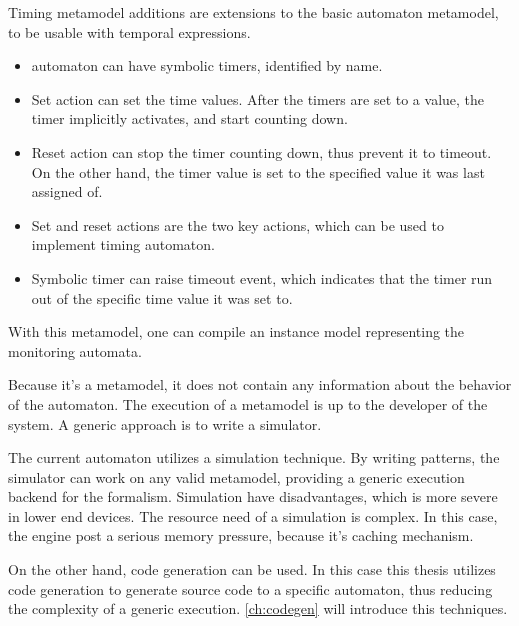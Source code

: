 Timing metamodel additions are extensions to the basic automaton metamodel, to be usable with temporal expressions.
\begin{itemize}
	\item automaton can have symbolic timers, identified by name.
	\item Set action can set the time values. After the timers are set to a value, the timer implicitly activates, and start counting down.
	\item Reset action can stop the timer counting down, thus prevent it to timeout. On the other hand, the timer value is set to the specified value it was last assigned of.
	\item Set and reset actions are the two key actions, which can be used to implement timing automaton.
	\item Symbolic timer can raise timeout event, which indicates that the timer run out of the specific time value it was set to.
\end{itemize}

With this metamodel, one can compile an instance model representing the monitoring automata.

Because it's a metamodel, it does not contain any information about the behavior of the automaton. The execution of a metamodel is up to the developer of the system. A generic approach is to write a simulator.

The current \viatrac{} automaton utilizes a simulation technique. By writing \viatraq{} patterns, the simulator can work on any valid metamodel, providing a generic execution backend for the formalism. Simulation have disadvantages, which is more severe in lower end devices. The resource need of a simulation is complex. In this case, the \viatraq{} engine post a serious memory pressure, because it's caching mechanism.

On the other hand, code generation can be used. In this case this thesis utilizes code generation to generate source code to a specific automaton, thus reducing the complexity of a generic execution. \cref{ch:codegen} will introduce this techniques.
